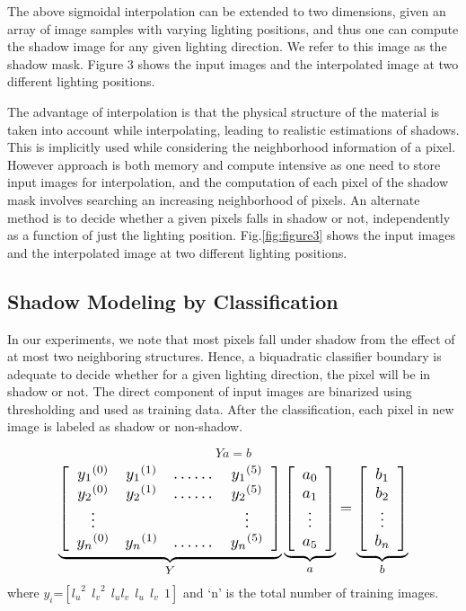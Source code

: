 The above sigmoidal interpolation can be extended to two dimensions, given an
array of image samples with varying lighting positions, and thus one can compute
the shadow image for any given lighting direction. We refer to this image as the
shadow mask. Figure 3 shows the input images and the interpolated image at two
different lighting positions.


The advantage of interpolation is that the physical structure of the material is
taken into account while interpolating, leading to realistic estimations of
shadows. This is implicitly used while considering the neighborhood information
of a pixel. However approach is both memory and compute intensive as one need to
store input images for interpolation, and the computation of each
pixel of the shadow mask involves searching an increasing neighborhood of
pixels. An alternate method is to decide whether a given pixels falls in shadow
or not, independently as a function of just the lighting position. Fig.\ref{fig:figure3} shows 
the input images and the interpolated image at two different lighting positions.


\subsection{Shadow Modeling by Classification}

In our experiments, we note that most pixels fall under shadow from the effect
of at most two neighboring structures. Hence, a biquadratic classifier boundary
is adequate to decide whether for a given lighting direction, the pixel will be
in shadow or not. The direct component of input images are binarized using
thresholding and used as training data. After the classification, each pixel in
new image is labeled as shadow or non-shadow.

\begin{equation}
 Ya=b
\end{equation}
\begin{equation}
\resizebox{.81\hsize}{!}{$
\underbrace{\left[ {\begin{array}{cccccc}
 {y_1}^{(0)} & {y_1}^{(1)} & \dots\dots & {y_1}^{(5)}\\
{y_2}^{(0)} & {y_2}^{(1)} & \dots\dots & {y_2}^{(5)} \\
 \vdots &  &  & \vdots \\
{y_n}^{(0)} & {y_n}^{(1)} & \dots\dots & {y_n}^{(5)}
 \end{array} } \right]}_{Y}
\underbrace{\left[ {\begin{array}{c}
a_0\\a_1\\ \vdots \\a_5
 \end{array} } \right]}_{a}
=
\underbrace{\left[ {\begin{array}{c}
b_1\\b_2\\ \vdots \\b_n
 \end{array} } \right]}_{b}$}
\end{equation}where
$y_i$=$[{l_u}^2\ \ {l_v}^2\ \ l_ul_v\ \ l_u\ \ l_v\ \ 1]$ and `n' is the total
number of training images.


